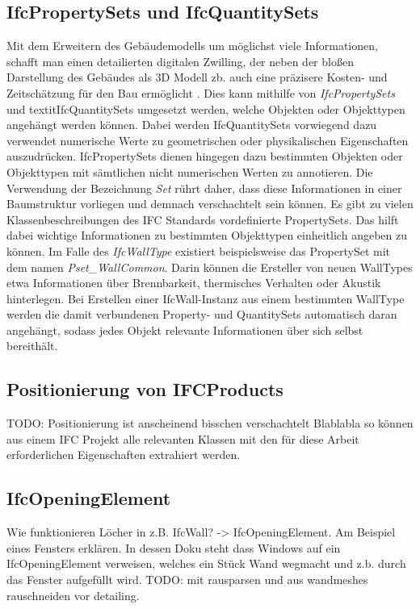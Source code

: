 \subsection{IfcPropertySets und IfcQuantitySets}\label{basics:ifc_properties}
Mit dem Erweitern des Gebäudemodells um möglichst viele Informationen, schafft man einen detailierten digitalen Zwilling, der neben der bloßen Darstellung des Gebäudes als 3D Modell zb. auch eine präzisere Kosten- und Zeitschätzung für den Bau ermöglicht \cite{Industry93:online}. 
Dies kann mithilfe von \textit{IfcPropertySets} und textit{IfcQuantitySets} umgesetzt werden, welche Objekten oder Objekttypen angehängt werden können.
Dabei werden IfcQuantitySets vorwiegend dazu verwendet numerische Werte zu geometrischen oder physikalischen Eigenschaften auszudrücken.
IfcPropertySets dienen hingegen dazu bestimmten Objekten oder  Objekttypen mit sämtlichen nicht numerischen Werten zu annotieren.
Die Verwendung der Bezeichnung \textit{Set} rührt daher, dass diese Informationen in einer Baumstruktur vorliegen und demnach verschachtelt sein können.
Es gibt zu vielen Klassenbeschreibungen des IFC Standards vordefinierte PropertySets.
Das hilft dabei wichtige Informationen zu bestimmten Objekttypen einheitlich angeben zu können.
Im Falle des \textit{IfcWallType} existiert beispielsweise das PropertySet mit dem namen \textit{Pset_WallCommon}.
Darin können die Ersteller von neuen WallTypes etwa Informationen über Brennbarkeit, thermisches Verhalten oder Akustik hinterlegen.
Bei Erstellen einer IfcWall-Instanz aus einem bestimmten WallType werden die damit verbundenen Property- und QuantitySets automatisch daran angehängt, sodass jedes Objekt relevante Informationen über sich selbst bereithält.

\subsection{Positionierung von IFCProducts}
TODO: Positionierung ist anscheinend bisschen verschachtelt
Blablabla so können aus einem IFC Projekt alle relevanten Klassen mit den für diese Arbeit erforderlichen Eigenschaften extrahiert werden.


\subsection{IfcOpeningElement}
\label{basics:IfcOpeningElement}
Wie funktionieren Löcher in z.B. IfcWall? -> IfcOpeningElement.
Am Beispiel eines Fensters erklären. In dessen Doku steht dass Windows auf ein IfcOpeningElement verweisen, welches ein Stück Wand wegmacht und z.b. durch das Fenster aufgefüllt wird.
TODO: mit rausparsen und aus wandmeshes rauschneiden vor detailing.

